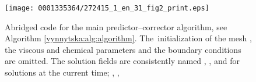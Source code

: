 \begin{figure}[!p]
\texttt{[image: 0001335364/272415\_1\_en\_31\_fig2\_print.eps]}
\caption{Abridged code for the main predictor--corrector algorithm,
      see \hbox{Algorithm} \ref{vynnytska:alg:algorithm}. The~initi\-alization
      of the mesh , the viscous and chemical parameters and
      the boundary conditions are omitted. The solution fields are
      consistently named , , and  for
      solutions at the current time; , ,
}
\end{figure}
